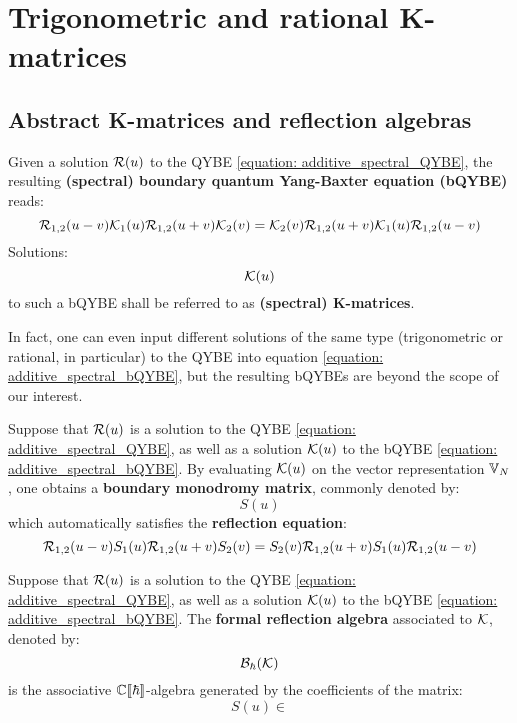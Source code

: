 \section{Trigonometric and rational K-matrices}
    \subsection{Abstract K-matrices and reflection algebras}
        \begin{definition} \label{def: additive_spectral_bQYBE}
            Given a solution $\mathcal{R}(u)$ to the QYBE \eqref{equation: additive_spectral_QYBE}, the resulting \textbf{(spectral) boundary quantum Yang-Baxter equation (bQYBE)} reads:
                \begin{equation} \label{equation: additive_spectral_bQYBE}
                    \mathcal{R}_{1, 2}(u - v) \mathcal{K}_1(u) \mathcal{R}_{1, 2}(u + v) \mathcal{K}_2(v) = \mathcal{K}_2(v) \mathcal{R}_{1, 2}(u + v) \mathcal{K}_1(u) \mathcal{R}_{1, 2}(u - v) 
                \end{equation}
            Solutions:
                $$\mathcal{K}(u)$$
            to such a bQYBE shall be referred to as \textbf{(spectral) K-matrices}.
        \end{definition}
        \begin{remark}
            In fact, one can even input different solutions of the same type (trigonometric or rational, in particular) to the QYBE into equation \eqref{equation: additive_spectral_bQYBE}, but the resulting bQYBEs are beyond the scope of our interest.
        \end{remark}
    
        \begin{definition} \label{def: boundary_monodromy_matrices}
            Suppose that $\mathcal{R}(u)$ is a solution to the QYBE \eqref{equation: additive_spectral_QYBE}, as well as a solution $\mathcal{K}(u)$ to the bQYBE \eqref{equation: additive_spectral_bQYBE}. By evaluating $\mathcal{K}(u)$ on the vector representation $\mathbb{V}_N$, one obtains a \textbf{boundary monodromy matrix}, commonly denoted by:
                $$S(u)$$
            which automatically satisfies the \textbf{reflection equation}:
                \begin{equation} \label{equation: reflection_equations}
                    \mathcal{R}_{1, 2}(u - v) S_1(u) \mathcal{R}_{1, 2}(u + v) S_2(v) = S_2(v) \mathcal{R}_{1, 2}(u + v) S_1(u) \mathcal{R}_{1, 2}(u - v) 
                \end{equation}
        \end{definition}
        \begin{definition} \label{def: reflection_algebras}
            Suppose that $\mathcal{R}(u)$ is a solution to the QYBE \eqref{equation: additive_spectral_QYBE}, as well as a solution $\mathcal{K}(u)$ to the bQYBE \eqref{equation: additive_spectral_bQYBE}. The \textbf{formal reflection algebra} associated to $\mathcal{K}$, denoted by:
                $$\mathcal{B}_{\hbar}(\mathcal{K})$$
            is the associative $\mathbb{C}[\![\hbar]\!]$-algebra generated by the coefficients of the matrix:
                $$S(u) \in $$
        \end{definition}

